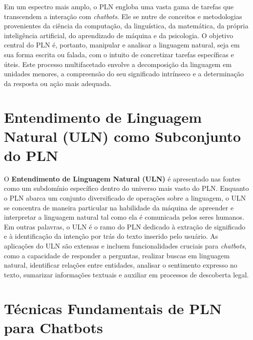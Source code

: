 \documentclass[14pt,a4paper,oneside]{book}
\begin{document}
Em um espectro mais amplo, o PLN engloba uma vasta gama de tarefas que transcendem a interação com \textit{chatbots}. Ele se nutre de conceitos e metodologias provenientes da ciência da computação, da linguística, da matemática, da própria inteligência artificial, do aprendizado de máquina e da psicologia. O objetivo central do PLN é, portanto, manipular e analisar a linguagem natural, seja em sua forma escrita ou falada, com o intuito de concretizar tarefas específicas e úteis. Este processo multifacetado envolve a decomposição da linguagem em unidades menores, a compreensão do seu significado intrínseco e a determinação da resposta ou ação mais adequada.

\section{Entendimento de Linguagem Natural (ULN) como Subconjunto do PLN}

O \textbf{Entendimento de Linguagem Natural (ULN)} é apresentado nas fontes como um subdomínio específico dentro do universo mais vasto do PLN. Enquanto o PLN abarca um conjunto diversificado de operações sobre a linguagem, o ULN se concentra de maneira particular na habilidade da máquina de apreender e interpretar a linguagem natural tal como ela é comunicada pelos seres humanos. 
Em outras palavras, o ULN é o ramo do PLN dedicado à extração de significado e à identificação da intenção por trás do texto inserido pelo usuário. As aplicações do ULN são extensas e incluem funcionalidades cruciais para \textit{chatbots}, como a capacidade de responder a perguntas, realizar buscas em linguagem natural, identificar relações entre entidades, analisar o sentimento expresso no texto, sumarizar informações textuais e auxiliar em processos de descoberta legal.


\section{Técnicas Fundamentais de PLN para Chatbots}
\end{document}
